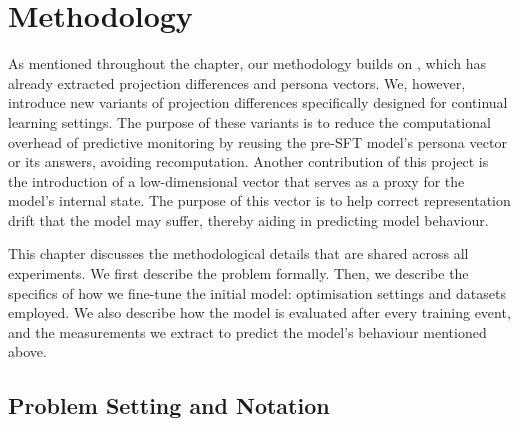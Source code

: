 \chapter{Methodology} %
\label{ch:methodology}
As mentioned throughout the chapter, our methodology builds on \citet{chen2025persona_vectors}, which has already extracted projection differences and persona vectors. We, however, introduce new variants of projection differences specifically designed for continual learning settings. The purpose of these variants is to reduce the computational overhead of predictive monitoring by reusing the pre-SFT model's persona vector or its answers, avoiding recomputation. Another contribution of this project is the introduction of a low-dimensional vector that serves as a proxy for the model's internal state. The purpose of this vector is to help correct representation drift that the model may suffer, thereby aiding in predicting model behaviour.

This chapter discusses the methodological details that are shared across all experiments. We first describe the problem formally. Then, we describe the specifics of how we fine-tune the initial model: optimisation settings and datasets employed. We also describe how the model is evaluated after every training event, and the measurements we extract to predict the model's behaviour mentioned above. 

\section{Problem Setting and Notation}
\label{sec:problem}

